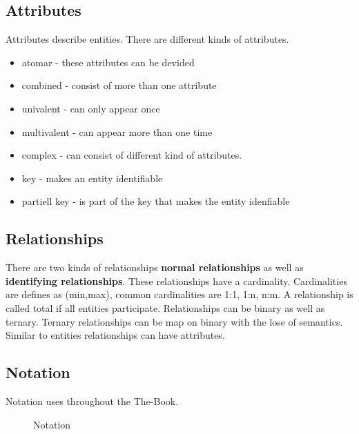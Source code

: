 \subsection{Attributes}
Attributes describe entities. There are different kinds of attributes.
\begin{itemize}
\setlength{\itemsep}{1pt}
	\item atomar - these attributes can be devided
	\item combined - consist of more than one attribute
	\item univalent - can only appear once
	\item multivalent - can appear more than one time
	\item complex - can consist of different kind of attributes.
	\item key - makes an entity identifiable
	\item partiell key - is part of the key that makes the entity idenfiable
\end{itemize}

\subsection{Relationships}
There are two kinds of relationships \textbf{normal relationships} as well as
\textbf{identifying relationships}. These relationships have a cardinality.
Cardinalities are defines as (min,max), common cardinalities are 1:1, 1:n, n:m.
A relationship is called total if all entities participate. Relationships can be
binary as well as ternary. Ternary relationships can be map on binary with the
lose of semantics. Similar to entities relationships can have attributes.

\subsection{Notation}
Notation uses throughout the The-Book.
\begin{figure}[h]
\scriptsize
{}
\caption{Notation}
\label{fig:is:Notation}
\end{figure}
